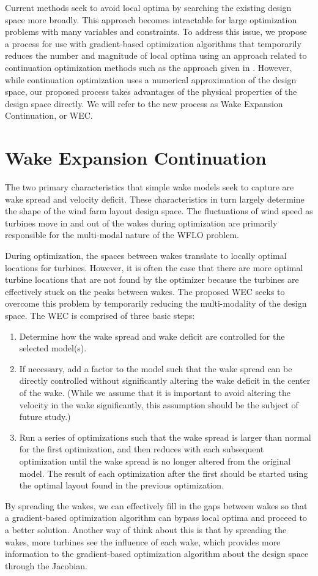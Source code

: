 \documentclass[a4paper]{jpconf}
\begin{document}
Current methods seek to avoid local optima by searching the existing design space more broadly. This approach becomes intractable for large optimization problems with many variables and constraints. To address this issue, we propose a process for use with gradient-based optimization algorithms that temporarily reduces the number and magnitude of local optima using an approach related to continuation optimization methods such as the approach given in \cite{mobahi2015}. However, while continuation optimization uses a numerical approximation of the design space, our proposed process takes advantages of the physical properties of the design space directly. We will refer to the new process as Wake Expansion Continuation, or WEC.

\section{Wake Expansion Continuation}\label{sec:dsrop}
The two primary characteristics that simple wake models seek to capture are wake spread and velocity deficit. These characteristics in turn largely determine the shape of the wind farm layout design space. The fluctuations of wind speed as turbines move in and out of the wakes during optimization are primarily responsible for the multi-modal nature of the WFLO problem. 

During optimization, the spaces between wakes translate to locally optimal locations for turbines. However, it is often the case that there are more optimal turbine locations that are not found by the optimizer because the turbines are effectively stuck on the peaks between wakes. The proposed WEC seeks to overcome this problem by temporarily reducing the multi-modality of the design space. The WEC is comprised of three basic steps:
\begin{enumerate}[label=\arabic*)]
	\item Determine how the wake spread and wake deficit are controlled for the selected model(s).
    \item If necessary, add a factor to the model such that the wake spread can be directly controlled without significantly altering the wake deficit in the center of the wake. (While we assume that it is important to avoid altering the velocity in the wake significantly, this assumption should be the subject of future study.)
    \item Run a series of optimizations such that the wake spread is larger than normal for the first optimization, and then reduces with each subsequent optimization until the wake spread is no longer altered from the original model. The result of each optimization after the first should be started using the optimal layout found in the previous optimization.
\end{enumerate}
By spreading the wakes, we can effectively fill in the gaps between wakes so that a gradient-based optimization algorithm can bypass local optima and proceed to a better solution. Another way of think about this is that by spreading the wakes, more turbines see the influence of each wake, which provides more information to the gradient-based optimization algorithm about the design space through the Jacobian.
\end{document}
